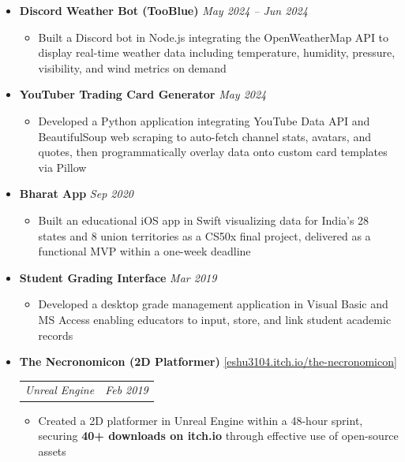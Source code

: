 \documentclass[10pt,letterpaper]{article}
\makeatletter
\newcommand{\resumeProjectHeading}[5]{%
  \vspace{5pt}%
  \item[]%
    {\small \textbf{#1} \enspace \href{#5}{\textcolor{accentblue}{[\underline{#2}]}}}\\[2pt]%
    {\small \begin{tabular*}{0.99\textwidth}{l@{\extracolsep{\fill}}r}%
      \textcolor{midgray}{\textit{\hspace{2pt}#3}} & \textcolor{midgray}{\textit{#4}}%
    \end{tabular*}}%
  \vspace{3pt}%
}
\newcommand{\resumeProjectHeadingDateOnly}[2]{%
  \vspace{5pt}%
  \item[]%
    {\small \textbf{#1} \hfill \textcolor{midgray}{\textit{#2}}}%
  \vspace{3pt}%
}
\newcommand{\resumeItem}[1]{
  \item {\small #1}
}
\makeatother
\begin{document}
\begin{itemize}[leftmargin=0in, label={}]
  \resumeProjectHeadingDateOnly{Discord Weather Bot (TooBlue)}{May 2024 -- Jun 2024}
  \begin{itemize}
    \resumeItem{Built a Discord bot in Node.js integrating the OpenWeatherMap API to display real-time weather data including temperature, humidity, pressure, visibility, and wind metrics on demand}
  \end{itemize}

  \resumeProjectHeadingDateOnly{YouTuber Trading Card Generator}{May 2024}
  \begin{itemize}
    \resumeItem{Developed a Python application integrating YouTube Data API and BeautifulSoup web scraping to auto-fetch channel stats, avatars, and quotes, then programmatically overlay data onto custom card templates via Pillow}
  \end{itemize}

  \resumeProjectHeadingDateOnly{Bharat App}{Sep 2020}
  \begin{itemize}
    \resumeItem{Built an educational iOS app in Swift visualizing data for India's 28 states and 8 union territories as a CS50x final project, delivered as a functional MVP within a one-week deadline}
  \end{itemize}

  \resumeProjectHeadingDateOnly{Student Grading Interface}{Mar 2019}
  \begin{itemize}
    \resumeItem{Developed a desktop grade management application in Visual Basic and MS Access enabling educators to input, store, and link student academic records}
  \end{itemize}

  \resumeProjectHeading
    {The Necronomicon (2D Platformer)}{eshu3104.itch.io/the-necronomicon}
    {Unreal Engine}
    {Feb 2019}
    {https://eshu3104.itch.io/the-necronomicon}
  \begin{itemize}
    \resumeItem{Created a 2D platformer in Unreal Engine within a 48-hour sprint, securing \textbf{40+ downloads on itch.io} through effective use of open-source assets}
  \end{itemize}

\end{itemize}

\end{document}
